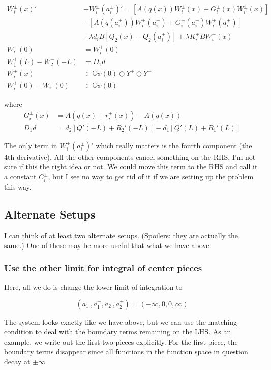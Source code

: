 \documentclass[12pt]{article}
\def\C{{\mathbb C}}
\begin{document}
\begin{align*}
W_i^\pm(x)' &- W_i^\pm(a_i^\pm)' = [A(q(x)) W_i^\pm(x) + G_i^\pm(x) W_i^\pm(x)] \\
&- [A(q(a_i^\pm)) W_i^\pm(a_i^\pm) + G_i^\pm(a_i^\pm) W_i^\pm(a_i^\pm)] \\
&+ \lambda d_i B[ Q_2(x) - Q_2(a_i^\pm) ] + \lambda K_i^\pm B W_i^\pm(x) \\
W_i^-(0) &= W_i^+(0) \\
W_1^+(L) - W_2^-(-L) &= D_1 d \\
W_i^\pm(x) &\in \C \psi(0) \oplus Y^+ \oplus Y^- \\
W_i^+(0) - W_i^-(0) &\in \C \psi(0) 
\end{align*}

where
\begin{align*}
G_i^\pm(x) &= A(q(x) + r_i^\pm(x)) - A(q(x)) \\
D_1 d &= d_2 [ Q'(-L) + R_2'(-L)] - d_1 [ Q'(L) + R_1'(L) ]
\end{align*}

The only term in $W_i^\pm(a_i^\pm)'$ which really matters is the fourth component (the 4th derivative). All the other components cancel something on the RHS. I'm not sure if this the right idea or not. We could move this term to the RHS and call it a constant $C_i^\pm$, but I see no way to get rid of it if we are setting up the problem this way.

\subsection*{Alternate Setups}


I can think of at least two alternate setups. (Spoilers: they are actually the same.) One of these may be more useful that what we have above.

\subsubsection*{Use the other limit for integral of center pieces}

Here, all we do is change the lower limit of integration to

\[
(a_1^-, a_1^+, a_2^-, a_2^+) = (-\infty, 0, 0, \infty)
\]

The system looks exactly like we have above, but we can use the matching condition to deal with the boundary terms remaining on the LHS. As an example, we write out the first two pieces explicitly. For the first piece, the boundary terms disappear since all functions in the function space in question decay at $\pm \infty$
\end{document}
